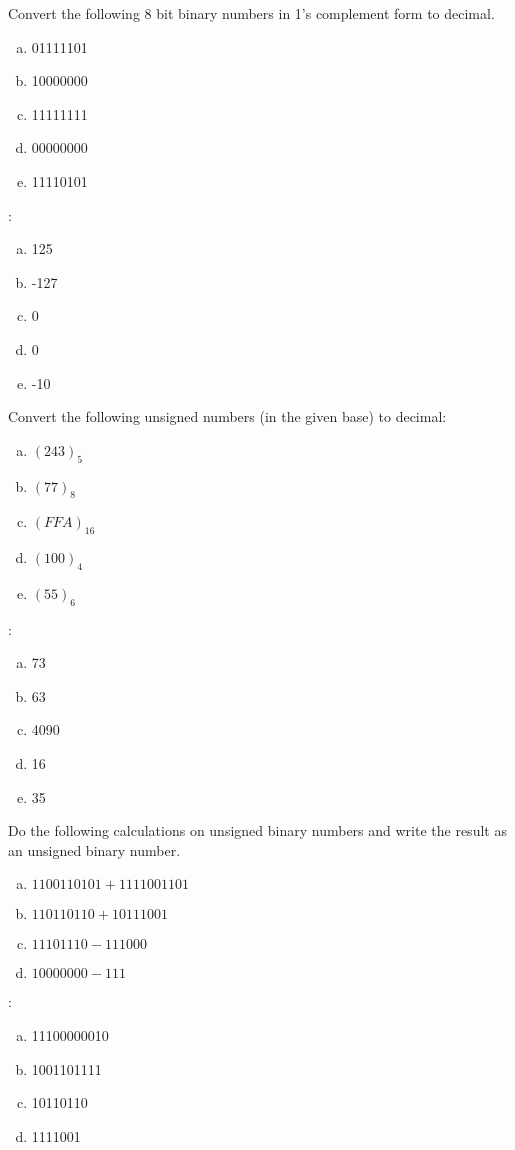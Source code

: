 \begin{ExerciseList}
\Exercise
Convert the following 8 bit binary numbers in 1's complement form to decimal.
\begin{enumerate}[a) ]
\item
01111101
\item
10000000
\item
11111111
\item
00000000
\item
11110101
\end{enumerate}

\Answer:
\begin{enumerate}[a) ]
\item
125
\item
-127
\item
0
\item
0
\item
-10
\end{enumerate}


\Exercise
Convert the following unsigned numbers (in the given base) to decimal:
\begin{enumerate}[a) ]
\item
$(243)_5$
\item
$(77)_8$
\item
$(FFA)_{16}$
\item
$(100)_4$
\item
$(55)_6$
\end{enumerate}

\Answer:
\begin{enumerate}[a) ]
\item
73
\item
63
\item
4090
\item
16
\item
35
\end{enumerate}

\Exercise
Do the following calculations on unsigned binary numbers and write the result as an unsigned binary number.
\begin{enumerate}[a) ]
\item
$1100110101 + 1111001101$
\item
$110110110 + 10111001$
\item
$11101110 - 111000$
\item
$10000000 - 111$
\end{enumerate}
 

\Answer:
\begin{enumerate}[a) ]
\item
11100000010
\item
1001101111
\item
10110110
\item
1111001
\end{enumerate}


\end{ExerciseList}
